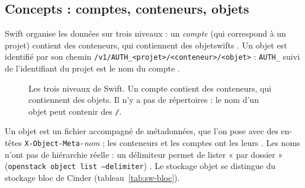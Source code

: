 \subsection{Concepts : comptes, conteneurs, objets}\label{sec:sw-concepts}

Swift organise les données sur trois niveaux : un \emph{compte} (qui correspond à un projet) contient des \glspl{conteneur},
qui contiennent des \glspl{objetswift} \parencite{swift-api-ref}. Un objet est identifié par son chemin
\texttt{/v1/AUTH\_<projet>/<conteneur>/<objet>} : \texttt{AUTH\_} suivi de l'identifiant du projet est le nom du compte
\parencite{swift-install-controller}.

\begin{figure}[!ht]
\centering
{}
\caption{Les trois niveaux de Swift. Un compte contient des conteneurs, qui contiennent des objets. Il n'y a pas de
répertoires : le nom d'un objet peut contenir des \texttt{/}.}
\label{fig:sw-hier}
\end{figure}

Un objet est un fichier accompagné de métadonnées, que l'on pose avec des en-têtes \texttt{X-Object-Meta-}\emph{nom} ; les
conteneurs et les comptes ont les leurs \parencite{swift-api-ref}. Les noms n'ont pas de hiérarchie réelle : un délimiteur
permet de lister « par dossier » (\texttt{openstack object list --delimiter}) \parencite{osc-object}. Le stockage objet se
distingue du stockage bloc de Cinder (tableau~\ref{tab:sw-bloc}).

